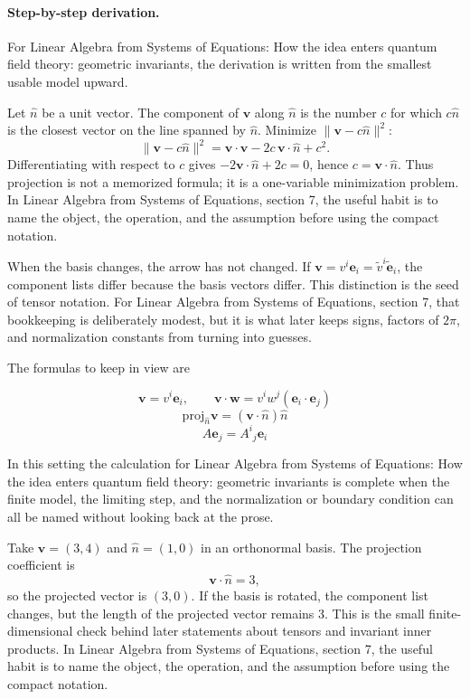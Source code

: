 \paragraph{Step-by-step derivation.}

For Linear Algebra from Systems of Equations: How the idea enters quantum field theory: geometric invariants, the derivation is written from the smallest usable model upward.

Let \(\hat n\) be a unit vector.  The component of \(\bm v\) along \(\hat n\) is the number \(c\) for which \(c\hat n\) is the closest vector on the line spanned by \(\hat n\).  Minimize \(\|\bm v-c\hat n\|^2\):
\[
  \|\bm v-c\hat n\|^2=\bm v\cdot\bm v-2c\,\bm v\cdot\hat n+c^2.
\]
Differentiating with respect to \(c\) gives \(-2\bm v\cdot\hat n+2c=0\), hence \(c=\bm v\cdot\hat n\).  Thus projection is not a memorized formula; it is a one-variable minimization problem.  In Linear Algebra from Systems of Equations, section 7, the useful habit is to name the object, the operation, and the assumption before using the compact notation.

When the basis changes, the arrow has not changed.  If \(\bm v=v^i\bm e_i=\tilde v^i\tilde{\bm e}_i\), the component lists differ because the basis vectors differ.  This distinction is the seed of tensor notation.  For Linear Algebra from Systems of Equations, section 7, that bookkeeping is deliberately modest, but it is what later keeps signs, factors of \(2\pi\), and normalization constants from turning into guesses.

The formulas to keep in view are

\[
  \bm v=v^i\bm e_i,\qquad \bm v\cdot\bm w=v^iw^j(\bm e_i\cdot\bm e_j)
\]
\[
  \mathrm{proj}_{\hat n}\bm v=(\bm v\cdot\hat n)\hat n
\]
\[
  A\bm e_j=A^i{}_j\bm e_i
\]

In this setting the calculation for Linear Algebra from Systems of Equations: How the idea enters quantum field theory: geometric invariants is complete when the finite model, the limiting step, and the normalization or boundary condition can all be named without looking back at the prose.




\begin{example}
Take \(\bm v=(3,4)\) and \(\hat n=(1,0)\) in an orthonormal basis.  The projection coefficient is
\[
  \bm v\cdot\hat n=3,
\]
so the projected vector is \((3,0)\).  If the basis is rotated, the component list changes, but the length of the projected vector remains \(3\).  This is the small finite-dimensional check behind later statements about tensors and invariant inner products.  In Linear Algebra from Systems of Equations, section 7, the useful habit is to name the object, the operation, and the assumption before using the compact notation.
\end{example}



